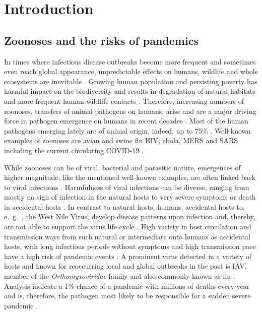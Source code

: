 \chapter{Introduction} \label{chap:Introduction}

\section{Zoonoses and the risks of pandemics}

In times where infectious disease outbreaks become more frequent and sometimes even reach global appearance, unpredictable effects on humans, wildlife and whole ecosystems are inevitable \autocite{schmeller_biodiversity_2020}. Growing human population and persisting poverty has harmful impact on the biodiversity and results in degradation of natural habitats and more frequent human-wildlife contacts  \autocite{schmeller_biodiversity_2020}. Therefore, increasing numbers of zoonoses, transfers of animal pathogens on humans, arise and are a major driving force in pathogen emergence on humans in recent decades \autocite{jones_global_2008}. Most of the human pathogens emerging lately are of animal origin, indeed, up to 75\% \autocite{woolhouse_risk_2001}. Well-known examples of zoonoses are avian and swine flu \gls{HIV}, ebola, \gls{MERS} and \gls{SARS} including the current circulating COVID-19 \autocite{van_reeth_avian_2007, sharp_origins_2011, suwantarat_risks_2015, verity_estimates_2020}.

\vspace{1em}

While zoonoses can be of viral, bacterial and parasitic nature, emergences of higher magnitude, like the mentioned well-known examples, are often linked back to viral infections \autocite{woolhouse_risk_2001}. Harmfulness of viral infections can be diverse, ranging from mostly no sign of infection in the natural hosts to very severe symptoms or death in accidental hosts \autocite{wahlgren_influenza_2011}. In contrast to natural hosts, humans, accidental hosts to, e.~g.~, the West Nile Virus, develop disease patterns upon infection and, thereby, are not able to support the virus life cycle \autocite{gea-banacloche_west_2004}. High variety in host circulation and transmission ways from such natural or intermediate onto humans as accidental hosts, with long infectious periods without symptoms and high transmission pace have a high risk of pandemic events \autocite{jamison_chapter_2017}. A prominent virus detected in a variety of hosts and known for reoccurring local and global outbreaks in the past is \gls{IAV}, member of the \textit{Orthomyxoviridae} family and also commonly known as flu \autocite{wahlgren_influenza_2011}. Analysis indicate a 1\% chance of a pandemic with millions of deaths every year and is, therefore, the pathogen most likely to be responsible for a sudden severe pandemic \autocite{jamison_chapter_2017}. 

